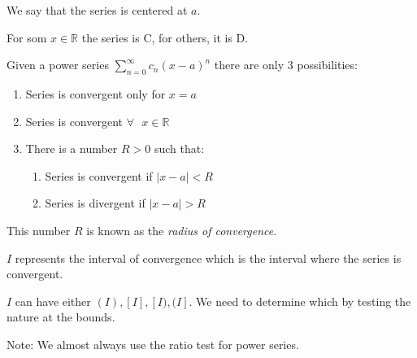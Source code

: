 \documentclass[12pt,letterpaper]{article} \usepackage{amsmath} \usepackage{graphicx}  \usepackage{longtable}  \usepackage{amssymb}
\begin{document}
    We say that the series is centered at $a$.

    For som $x\in\mathbb{R}$ the series is C, for others, it is D.

    Given a power series $\sum^{\infty}_{n=0} c_n (x-a)^n$ there are only 3 possibilities:
    \begin{enumerate}
        \item Series is convergent only for $x=a$
        \item Series is convergent $\forall \text{ } x \in \mathbb{R}$
        \item There is a number $R>0$ such that:
        \begin{enumerate}[leftmargin=\dimexpr\parindent+2em\relax]
            \item Series is convergent if $|x-a|<R$
            \item Series is divergent if $|x-a|>R$
        \end{enumerate}
    \end{enumerate}

    This number $R$ is known as the \emph{radius of convergence}. 

    $I$ represents the interval of convergence which is the interval where the series is convergent. 

    $I$ can have either $(I), [I], [I), (I]$. We need to determine which by testing the nature at the bounds. 

    Note: We almost always use the ratio test for power series. 
\end{document}
